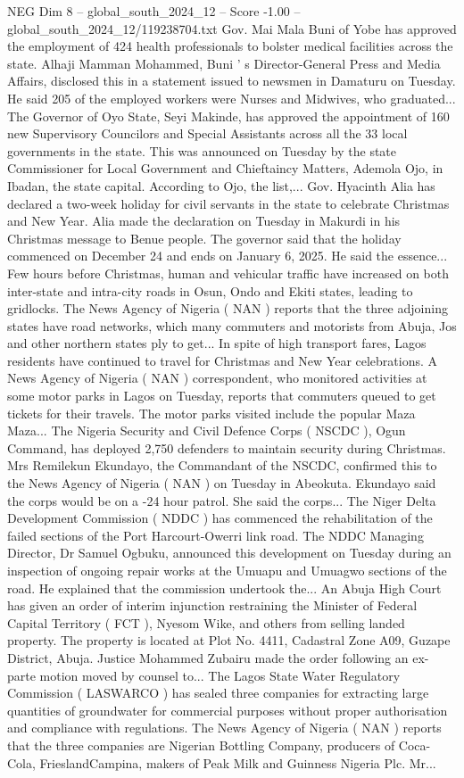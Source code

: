 \begin{textsample}{NEG Dim 8 – global\_south\_2024\_12 – Score -1.00 – global\_south\_2024\_12/119238704.txt}
Gov.
Mai Mala Buni of Yobe has approved the employment of 424 health professionals to bolster medical facilities across the state.
Alhaji Mamman Mohammed, Buni ' s Director-General Press and Media Affairs, disclosed this in a statement issued to newsmen in Damaturu on Tuesday.
He said 205 of the employed workers were Nurses and Midwives, who graduated...
The Governor of Oyo State, Seyi Makinde, has approved the appointment of 160 new Supervisory Councilors and Special Assistants across all the 33 local governments in the state.
This was announced on Tuesday by the state Commissioner for Local Government and Chieftaincy Matters, Ademola Ojo, in Ibadan, the state capital.
According to Ojo, the list,...
Gov.
Hyacinth Alia has declared a two-week holiday for civil servants in the state to celebrate Christmas and New Year.
Alia made the declaration on Tuesday in Makurdi in his Christmas message to Benue people.
The governor said that the holiday commenced on December 24 and ends on January 6, 2025.
He said the essence...
Few hours before Christmas, human and vehicular traffic have increased on both inter-state and intra-city roads in Osun, Ondo and Ekiti states, leading to gridlocks.
The News Agency of Nigeria ( NAN ) reports that the three adjoining states have road networks, which many commuters and motorists from Abuja, Jos and other northern states ply to get...
In spite of high transport fares, Lagos residents have continued to travel for Christmas and New Year celebrations.
A News Agency of Nigeria ( NAN ) correspondent, who monitored activities at some motor parks in Lagos on Tuesday, reports that commuters queued to get tickets for their travels.
The motor parks visited include the popular Maza Maza...
The Nigeria Security and Civil Defence Corps ( NSCDC ), Ogun Command, has deployed 2,750 defenders to maintain security during Christmas.
Mrs Remilekun Ekundayo, the Commandant of the NSCDC, confirmed this to the News Agency of Nigeria ( NAN ) on Tuesday in Abeokuta.
Ekundayo said the corps would be on a -24 hour patrol.
She said the corps...
The Niger Delta Development Commission ( NDDC ) has commenced the rehabilitation of the failed sections of the Port Harcourt-Owerri link road.
The NDDC Managing Director, Dr Samuel Ogbuku, announced this development on Tuesday during an inspection of ongoing repair works at the Umuapu and Umuagwo sections of the road.
He explained that the commission undertook the...
An Abuja High Court has given an order of interim injunction restraining the Minister of Federal Capital Territory ( FCT ), Nyesom Wike, and others from selling landed property.
The property is located at Plot No. 4411, Cadastral Zone A09, Guzape District, Abuja.
Justice Mohammed Zubairu made the order following an ex-parte motion moved by counsel to...
The Lagos State Water Regulatory Commission ( LASWARCO ) has sealed three companies for extracting large quantities of groundwater for commercial purposes without proper authorisation and compliance with regulations.
The News Agency of Nigeria ( NAN ) reports that the three companies are Nigerian Bottling Company, producers of Coca-Cola, FrieslandCampina, makers of Peak Milk and Guinness Nigeria Plc.
Mr...


\end{textsample}
